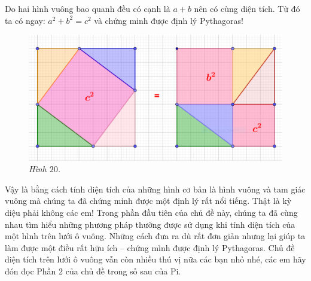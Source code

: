 \begin{multicols}{2}
\begin{figure}[H]
		\vspace*{-10pt}
	\end{figure}
	Do hai hình vuông bao quanh đều có cạnh là $a+b$ nên có cùng diện tích. Từ đó ta có ngay: $a^2+b^2=c^2$ và chứng minh được định lý Pythagoras!
	\begin{figure}[H]
		\centering
		\vspace*{-5pt}
		\captionsetup{labelformat= empty, justification=centering}
		\includegraphics[width=1\linewidth]{20}
		\caption{\small\textit{\color{toancuabi}Hình $20$.}}
		\vspace*{-10pt}
	\end{figure}
	Vậy là bằng cách tính diện tích của những hình cơ bản là hình vuông và tam giác vuông mà chúng ta đã chứng minh được một định lý rất nổi tiếng. Thật là kỳ diệu phải không các em!
	\vskip 0.1cm
	Trong phần đầu tiên của chủ đề này, chúng ta đã cùng nhau tìm hiểu những phương pháp thường được sử dụng khi tính diện tích của một hình trên lưới ô vuông. Những cách đưa ra dù rất đơn giản nhưng lại giúp ta làm được một điều rất hữu ích -- chứng mình được định lý Pythagoras. Chủ đề diện tích trên lưới ô vuông vẫn còn nhiều thú vị nữa các bạn nhỏ nhé, các em hãy đón đọc Phần $2$ của chủ đề trong số sau của Pi.	
\end{multicols}

